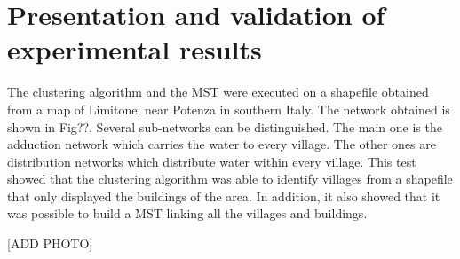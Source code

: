 \chapter{Presentation and validation of experimental results }
\label{capitolo6}
\thispagestyle{empty}



\noindent
The clustering algorithm and the MST were executed on a shapefile obtained from a map of Limitone,
near Potenza in southern Italy. The network obtained is shown in Fig??.
Several sub-networks can be distinguished. The main one is the adduction network which carries the water to
every village. The other ones are distribution networks which distribute water within every village.
This test showed that the clustering algorithm was able to identify villages from a shapefile that only
displayed the buildings of the area. In addition, it also showed that it was possible to build a MST 
linking all the villages and buildings.

[ADD PHOTO]

